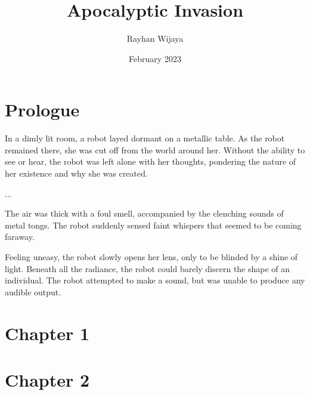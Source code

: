 \documentclass[12pt]{book}
\title{Apocalyptic Invasion}
\author{Rayhan Wijaya}
\date{February 2023}
\begin{document}
\maketitle

\section*{Prologue}

In a dimly lit room, a robot layed dormant on a metallic table. As the
robot remained there, she was cut off from the world around her.
Without the ability to see or hear, the robot was left alone with her
thoughts, pondering the nature of her existence and why she was
created.

...

The air was thick with a foul smell, accompanied by the clenching
sounds of metal tongs. The robot suddenly sensed faint whispers that
seemed to be coming faraway.

Feeling uneasy, the robot slowly opens her lens, only to be blinded by
a shine of light. Beneath all the radiance, the robot could barely
discern the shape of an individual. The robot attempted to make a
sound, but was unable to produce any audible output.

\section*{Chapter 1}

\section*{Chapter 2}
\end{document}
